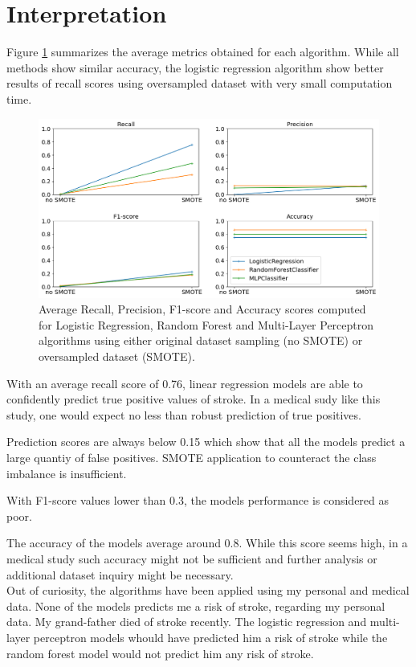 \section{Interpretation}
Figure \ref{metrics_all} summarizes the average metrics obtained for each algorithm. While all 
methods show similar accuracy, the logistic regression algorithm show better results of recall scores 
using oversampled dataset with very small computation time.

\begin{figure}[H]
\centering
\includegraphics[scale=0.5]{../figures/plot_metrics_all.png}
\caption{Average Recall, Precision, F1-score and Accuracy scores computed for Logistic Regression, 
Random Forest and Multi-Layer Perceptron algorithms using either original dataset sampling (no SMOTE) 
or oversampled dataset (SMOTE).}
\label{metrics_all}
\end{figure}

With an average recall score of 0.76, linear regression models are able to confidently predict true
positive values of stroke. In a medical sudy like this study, one would expect no less than robust 
prediction of true positives.

Prediction scores are always below 0.15 which show that all the models predict a large quantiy of 
false positives. SMOTE application to counteract the class imbalance is insufficient.

With F1-score values lower than 0.3, the models performance is considered as poor.

The accuracy of the models average around 0.8. While this score seems high, in a medical study such 
accuracy might not be sufficient and further analysis or additional dataset inquiry might be 
necessary.\\ 


Out of curiosity, the algorithms have been applied using my personal and medical data. None of the 
models predicts me a risk of stroke, regarding my personal data. My grand-father died of stroke 
recently. The logistic regression and multi-layer perceptron models whould have predicted him a risk 
of stroke while the random forest model would not predict him any risk of stroke. 
